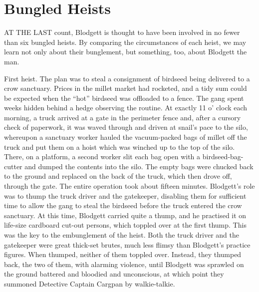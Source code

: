 \chapter{Bungled Heists}

AT THE LAST count, Blodgett is thought to have been involved in no fewer than six bungled heists. By comparing the circumstances of each heist, we may learn not only about their bunglement, but something, too, about Blodgett the man.

First heist. The plan was to steal a consignment of birdseed being delivered to a crow sanctuary. Prices in the millet market had rocketed, and a tidy sum could be expected when the ``hot'' birdseed was offloaded to a fence. The gang spent weeks hidden behind a hedge observing the routine. At exactly 11 o' clock each morning, a truck arrived at a gate in the perimeter fence and, after a cursory check of paperwork, it was waved through and driven at snail's pace to the silo, whereupon a sanctuary worker hauled the vacuum-packed bags of millet off the truck and put them on a hoist which was winched up to the top of the silo. There, on a platform, a second worker slit each bag open with a birdseed-bag-cutter and dumped the contents into the silo. The empty bags were chucked back to the ground and replaced on the back of the truck, which then drove off, through the gate. The entire operation took about fifteen minutes. Blodgett's role was to thump the truck driver and the gatekeeper, disabling them for sufficient time to allow the gang to steal the birdseed before the truck entered the crow sanctuary. At this time, Blodgett carried quite a thump, and he practised it on life-size cardboard cut-out persons, which toppled over at the first thump. This was the key to the embunglement of the heist. Both the truck driver and the gatekeeper were great thick-set brutes, much less flimsy than Blodgett's practice figures. When thumped, neither of them toppled over. Instead, they thumped back, the two of them, with alarming violence, until Blodgett was sprawled on the ground battered and bloodied and unconscious, at which point they summoned Detective Captain Cargpan by walkie-talkie.

